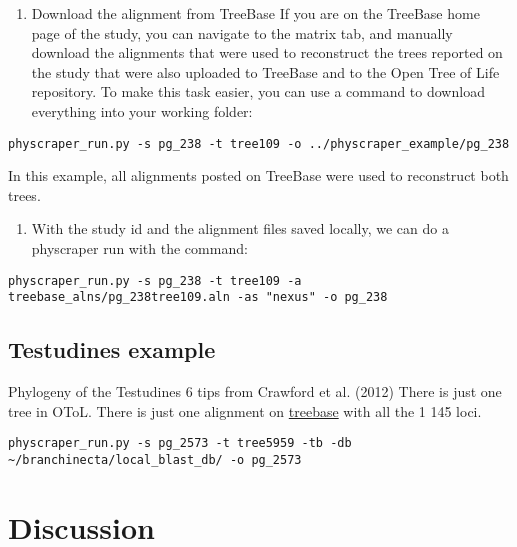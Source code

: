 \documentclass[draft]{ametsoc}
\begin{document}
\begin{enumerate}
\def\labelenumi{\arabic{enumi}.}
\tightlist
\item
  Download the alignment from TreeBase If you are on the TreeBase home
  page of the study, you can navigate to the matrix tab, and manually
  download the alignments that were used to reconstruct the trees
  reported on the study that were also uploaded to TreeBase and to the
  Open Tree of Life repository. To make this task easier, you can use a
  command to download everything into your working folder:
\end{enumerate}

\begin{verbatim}
physcraper_run.py -s pg_238 -t tree109 -o ../physcraper_example/pg_238
\end{verbatim}

In this example, all alignments posted on TreeBase were used to
reconstruct both trees.

\begin{enumerate}
\def\labelenumi{\arabic{enumi}.}
\tightlist
\item
  With the study id and the alignment files saved locally, we can do a
  physcraper run with the command:
\end{enumerate}

\begin{verbatim}
physcraper_run.py -s pg_238 -t tree109 -a treebase_alns/pg_238tree109.aln -as "nexus" -o pg_238
\end{verbatim}

\hypertarget{testudines-example}{%
\subsection{Testudines example}\label{testudines-example}}

Phylogeny of the Testudines 6 tips from Crawford et al. (2012) There is
just one tree in OToL. There is just one alignment on
\href{https://treebase.org/treebase-web/search/study/matrices.html?id=12742}{treebase}
with all the 1 145 loci.

\begin{verbatim}
physcraper_run.py -s pg_2573 -t tree5959 -tb -db ~/branchinecta/local_blast_db/ -o pg_2573
\end{verbatim}

\hypertarget{discussion}{%
\section{Discussion}\label{discussion}}
\end{document}
